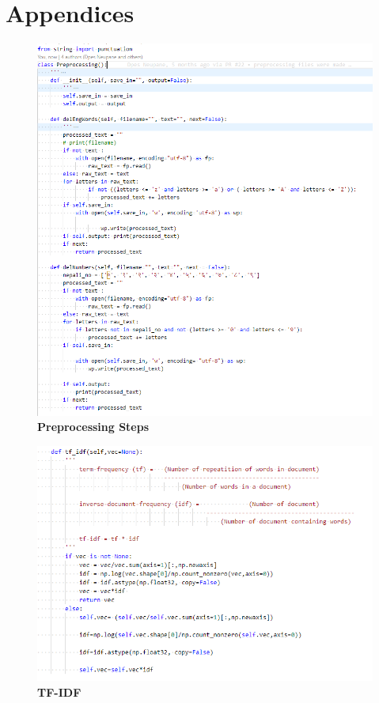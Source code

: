 \documentclass[12pt]{report}
\begin{document}
    \chapter{Appendices}
    \begin{figure}[h]
        \centering
        \includegraphics[scale=0.55]{preprocessing.png}
        \caption{\textbf{Preprocessing Steps}}
    \end{figure}
    \begin{figure}[h]
        \centering
        \includegraphics[scale=0.6]{Tfcode.png}
        \caption{\textbf{TF-IDF}}
    \end{figure}
\end{document}

